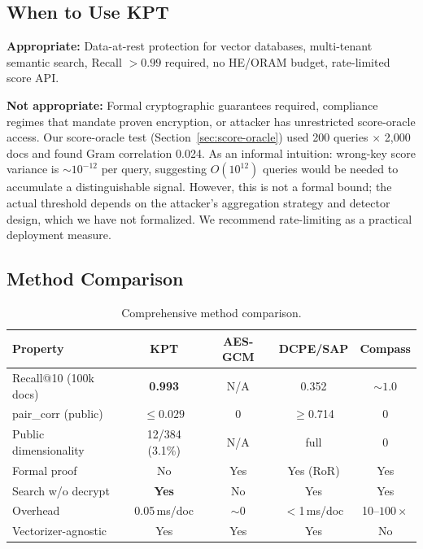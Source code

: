 \documentclass{article}
\begin{document}
\subsection{When to Use KPT}

\textbf{Appropriate:} Data-at-rest protection for vector databases, multi-tenant semantic search, Recall $> 0.99$ required, no HE/ORAM budget, rate-limited score API.

\textbf{Not appropriate:} Formal cryptographic guarantees required, compliance regimes that mandate proven encryption, or attacker has unrestricted score-oracle access.
Our score-oracle test (Section~\ref{sec:score-oracle}) used 200 queries $\times$ 2{,}000 docs and found Gram correlation 0.024.
As an informal intuition: wrong-key score variance is ${\sim}10^{-12}$ per query, suggesting $O(10^{12})$ queries would be needed to accumulate a distinguishable signal.
However, this is not a formal bound; the actual threshold depends on the attacker's aggregation strategy and detector design, which we have not formalized.
We recommend rate-limiting as a practical deployment measure.

\subsection{Method Comparison}

\begin{table}[htbp]
\centering
\caption{Comprehensive method comparison.}
\label{tab:method-comparison}
\begin{tabular}{@{}lcccc@{}}
\toprule
\textbf{Property} & \textbf{KPT} & \textbf{AES-GCM} & \textbf{DCPE/SAP} & \textbf{Compass} \\
\midrule
Recall@10 (100k docs) & \textbf{0.993} & N/A & 0.352 & ${\sim}1.0$ \\
pair\_corr (public) & $\mathbf{\leq 0.029}$ & 0 & $\geq$0.714 & 0 \\
Public dimensionality & 12/384 (3.1\%) & N/A & full & 0 \\
Formal proof & No & Yes & Yes (RoR) & Yes \\
Search w/o decrypt & \textbf{Yes} & No & Yes & Yes \\
Overhead & 0.05\,ms/doc & ${\sim}0$ & $<$1\,ms/doc & 10--$100\times$ \\
Vectorizer-agnostic & Yes & Yes & Yes & No \\
\bottomrule
\end{tabular}
\end{table}
\end{document}
